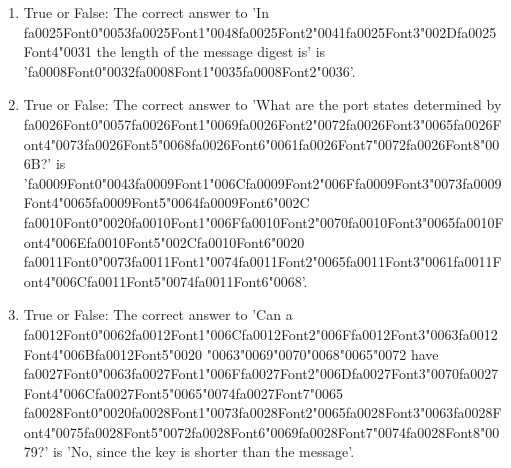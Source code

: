 \documentclass[12pt]{article}
\begin{document}
\begin{enumerate}[label=\arabic*.]
\item True or False: The correct answer to 'In {\csname fa0025Font0\endcsname\char"0053}{\csname fa0025Font1\endcsname\char"0048}{\csname fa0025Font2\endcsname\char"0041}{\csname fa0025Font3\endcsname\char"002D}{\csname fa0025Font4\endcsname\char"0031} the length of the message digest is' is '{\csname fa0008Font0\endcsname\char"0032}{\csname fa0008Font1\endcsname\char"0035}{\csname fa0008Font2\endcsname\char"0036}'.
\item True or False: The correct answer to 'What are the port states determined by {\csname fa0026Font0\endcsname\char"0057}{\csname fa0026Font1\endcsname\char"0069}{\csname fa0026Font2\endcsname\char"0072}{\csname fa0026Font3\endcsname\char"0065}{\csname fa0026Font4\endcsname\char"0073}{\csname fa0026Font5\endcsname\char"0068}{\csname fa0026Font6\endcsname\char"0061}{\csname fa0026Font7\endcsname\char"0072}{\csname fa0026Font8\endcsname\char"006B}?' is '{\csname fa0009Font0\endcsname\char"0043}{\csname fa0009Font1\endcsname\char"006C}{\csname fa0009Font2\endcsname\char"006F}{\csname fa0009Font3\endcsname\char"0073}{\csname fa0009Font4\endcsname\char"0065}{\csname fa0009Font5\endcsname\char"0064}{\csname fa0009Font6\endcsname\char"002C} {\csname fa0010Font0\endcsname\char"0020}{\csname fa0010Font1\endcsname\char"006F}{\csname fa0010Font2\endcsname\char"0070}{\csname fa0010Font3\endcsname\char"0065}{\csname fa0010Font4\endcsname\char"006E}{\csname fa0010Font5\endcsname\char"002C}{\csname fa0010Font6\endcsname\char"0020} {\csname fa0011Font0\endcsname\char"0073}{\csname fa0011Font1\endcsname\char"0074}{\csname fa0011Font2\endcsname\char"0065}{\csname fa0011Font3\endcsname\char"0061}{\csname fa0011Font4\endcsname\char"006C}{\csname fa0011Font5\endcsname\char"0074}{\csname fa0011Font6\endcsname\char"0068}'.
\item True or False: The correct answer to 'Can a {\csname fa0012Font0\endcsname\char"0062}{\csname fa0012Font1\endcsname\char"006C}{\csname fa0012Font2\endcsname\char"006F}{\csname fa0012Font3\endcsname\char"0063}{\csname fa0012Font4\endcsname\char"006B}{\csname fa0012Font5\endcsname\char"0020} {\char"0063}{\char"0069}{\char"0070}{\char"0068}{\char"0065}{\char"0072} have {\csname fa0027Font0\endcsname\char"0063}{\csname fa0027Font1\endcsname\char"006F}{\csname fa0027Font2\endcsname\char"006D}{\csname fa0027Font3\endcsname\char"0070}{\csname fa0027Font4\endcsname\char"006C}{\csname fa0027Font5\endcsname\char"0065}{\char"0074}{\csname fa0027Font7\endcsname\char"0065} {\csname fa0028Font0\endcsname\char"0020}{\csname fa0028Font1\endcsname\char"0073}{\csname fa0028Font2\endcsname\char"0065}{\csname fa0028Font3\endcsname\char"0063}{\csname fa0028Font4\endcsname\char"0075}{\csname fa0028Font5\endcsname\char"0072}{\csname fa0028Font6\endcsname\char"0069}{\csname fa0028Font7\endcsname\char"0074}{\csname fa0028Font8\endcsname\char"0079}?' is 'No, since the key is shorter than the message'.

\end{enumerate}
\end{document}

